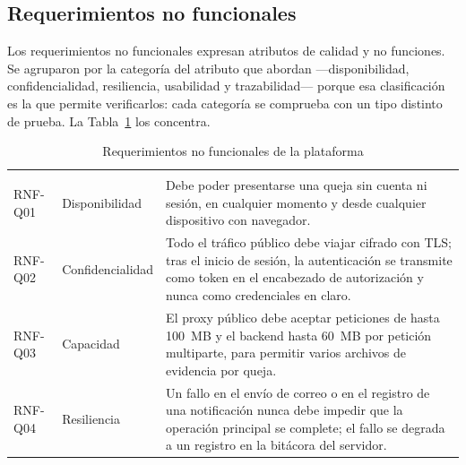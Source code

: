 	\subsection{Requerimientos no funcionales}
	Los requerimientos no funcionales expresan atributos de calidad y no funciones. Se agruparon
	por la categoría del atributo que abordan ---disponibilidad, confidencialidad, resiliencia,
	usabilidad y trazabilidad--- porque esa clasificación es la que permite verificarlos: cada
	categoría se comprueba con un tipo distinto de prueba. La Tabla~\ref{tab:rnf} los concentra.
	
	
	\small
	\renewcommand{\arraystretch}{1.2}
	\setlength{\tabcolsep}{4pt}
	
	\begin{longtable}{|p{1.7cm}|p{2.7cm}|p{9.7cm}|}
		\caption{Requerimientos no funcionales de la plataforma}
		\label{tab:rnf} \\
		\hline
		\rowcolor{headerblue}
		\headercell{ID} & \headercell{Categoría} & \headercell{Atributo requerido} \\
		\hline
		\endfirsthead
	
		\hline
		\rowcolor{headerblue}
		\headercell{ID} & \headercell{Categoría} & \headercell{Atributo requerido} \\
		\hline
		\endhead
	
		RNF-Q01 & Disponibilidad & Debe poder presentarse una queja sin cuenta ni sesión, en
		cualquier momento y desde cualquier dispositivo con navegador. \\ \hline
	
		RNF-Q02 & Confidencialidad & Todo el tráfico público debe viajar cifrado con TLS; tras el
		inicio de sesión, la autenticación se transmite como token en el encabezado de autorización y
		nunca como credenciales en claro. \\ \hline
	
		RNF-Q03 & Capacidad & El proxy público debe aceptar peticiones de hasta 100~MB y el backend
		hasta 60~MB por petición multiparte, para permitir varios archivos de evidencia por queja.
		\\ \hline
	
		RNF-Q04 & Resiliencia & Un fallo en el envío de correo o en el registro de una notificación
		nunca debe impedir que la operación principal se complete; el fallo se degrada a un registro
		en la bitácora del servidor. \\ \hline
	

\end{longtable}
